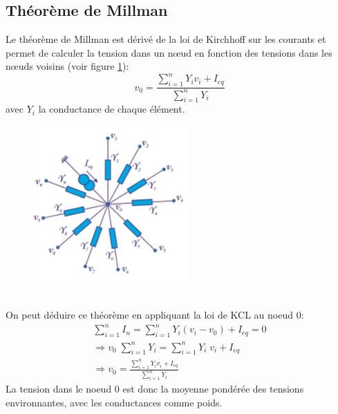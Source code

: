 \subsection{Théorème de Millman}
Le théorème de Millman est dérivé de la loi de Kirchhoff sur les courants et permet de calculer la tension dans un nœud en fonction des tensions dans les nœuds voisins (voir figure \ref{fig:millman}):
\begin{equation}
	v_0 = \frac{\sum_{i=1}^n Y_i v_i + I_{eq}}{\sum_{i=1}^n Y_i}
	\label{eq:millman}
\end{equation}
avec $Y_i$ la conductance de chaque élément.
\begin{figure}[h!]
	\centering
	\includegraphics[width=6cm]{figures/ch00/millman.jpg}
	\caption{}
	\label{fig:millman}
\end{figure}
\\On peut déduire ce théorème en appliquant la loi de KCL au noeud $0$:
\begin{align*}
	\sum_{i = 1}^n I_n = \sum_{i = 1}^n Y_i(v_i - v_0) + I_{eq} = 0 \\
	\Rightarrow v_0 \; \sum_{i = 1}^n Y_i = \sum_{i = 1}^n Y_i\;v_i  + I_{eq} \\
	\Rightarrow v_0  = \frac{\sum_{i=1}^n Y_i v_i + I_{eq}}{\sum_{i=1}^n Y_i} 
\end{align*}
La tension dans le noeud $0$ est donc la moyenne pondérée des tensions environnantes, avec les conductances comme poids.

